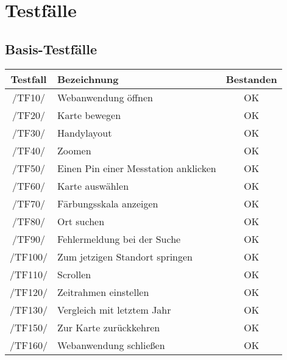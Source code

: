 \section{Testfälle}
\subsection{Basis-Testfälle}
\begin{center}
    \begin{tabular}[h]{|c|l|c|}
        \hline
        \textbf{Testfall} & \textbf{Bezeichnung} & \textbf{Bestanden} \\
        \hline
        /TF10/ & Webanwendung öffnen & \cellcolor{green!25}OK \\
        \hline
        /TF20/ & Karte bewegen & \cellcolor{green!25}OK \\
        \hline
        /TF30/ & Handylayout & \cellcolor{green!25}OK \\
        \hline
        /TF40/ & Zoomen & \cellcolor{green!25}OK \\
        \hline
         /TF50/ & Einen Pin einer Messtation anklicken & \cellcolor{green!25}OK \\
        \hline
        /TF60/ & Karte auswählen & \cellcolor{green!25}OK \\
        \hline
        /TF70/ & Färbungsskala anzeigen & \cellcolor{green!25}OK \\
        \hline
         /TF80/ & Ort suchen & \cellcolor{green!25}OK \\
        \hline
         /TF90/ & Fehlermeldung bei der Suche & \cellcolor{green!25}OK \\
        \hline
        /TF100/ & Zum jetzigen Standort springen & \cellcolor{green!25}OK \\
        \hline
        /TF110/ & Scrollen & \cellcolor{green!25}OK \\
        \hline
         /TF120/ & Zeitrahmen einstellen & \cellcolor{green!25}OK \\
        \hline
         /TF130/ & Vergleich mit letztem Jahr & \cellcolor{green!25}OK \\
        \hline
        /TF150/ & Zur Karte zurückkehren & \cellcolor{green!25}OK \\
        \hline
         /TF160/ & Webanwendung schließen & \cellcolor{green!25}OK \\
        \hline

    \end{tabular}
\end{center}

